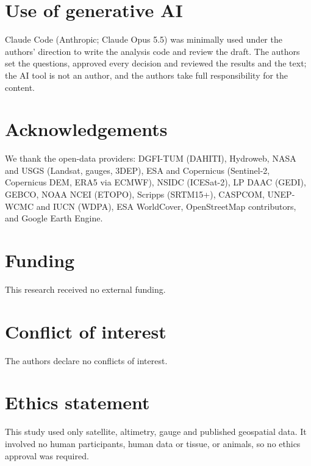 \section*{Use of generative AI}
Claude Code (Anthropic; Claude Opus 5.5) was minimally used under the authors' direction to write the analysis code and review the draft. The authors set the questions, approved every decision and reviewed the results and the text; the AI tool is not an author, and the authors take full responsibility for the content.

\section*{Acknowledgements}
We thank the open-data providers: DGFI-TUM (DAHITI), Hydroweb, NASA and USGS (Landsat, gauges, 3DEP), ESA and Copernicus (Sentinel-2, Copernicus DEM, ERA5 via ECMWF), NSIDC (ICESat-2), LP DAAC (GEDI), GEBCO, NOAA NCEI (ETOPO), Scripps (SRTM15+), CASPCOM, UNEP-WCMC and IUCN (WDPA), ESA WorldCover, OpenStreetMap contributors, and Google Earth Engine.

\section*{Funding}
This research received no external funding.

\section*{Conflict of interest}
The authors declare no conflicts of interest.

\section*{Ethics statement}
This study used only satellite, altimetry, gauge and published geospatial data. It involved no human participants, human data or tissue, or animals, so no ethics approval was required.
